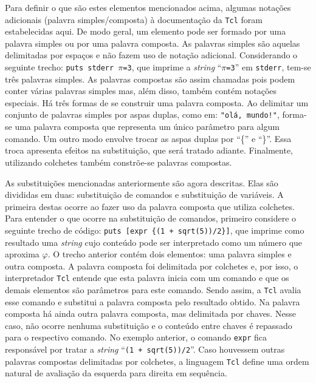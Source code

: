 Para definir o que são estes elementos mencionados acima, algumas
notações adicionais (palavra simples/composta) à documentação da \texttt{Tcl}
\cite{Tcl.n-manpage} foram estabelecidas aqui. De modo geral, um
elemento pode ser formado por uma palavra simples ou por uma palavra
composta. As palavras simples são
aquelas delimitadas por espaços e não fazem uso de notação adicional.
Considerando o seguinte trecho:
\texttt{puts stderr $\pi$=3},
 que imprime a \textit{string} ``\texttt{$\pi$=3}''
em \verb!stderr!, tem-se três palavras simples. As palavras compostas
são assim chamadas pois podem conter várias palavras simples mas, além
disso, também contém notações especiais. Há três formas de se
construir uma palavra composta. Ao delimitar um conjunto de
palavras simples por aspas duplas, como em: \verb|"olá, mundo!"|,
forma-se uma palavra composta que representa um único parâmetro para
algum comando. Um outro modo envolve trocar as aspas duplas por ``\{''
e ``\}''. Essa troca apresenta efeitos na substituição, que será
tratado adiante. Finalmente, utilizando colchetes também constrõe-se
palavras compostas.

As substituições mencionadas anteriormente são agora descritas. Elas
são divididas em duas: substituição de comandos e substituição de
variáveis. A primeira destas ocorre ao fazer uso da palavra composta
que utiliza colchetes. Para entender o que ocorre na substituição de
comandos, primeiro considere o seguinte trecho de código:
\verb!puts [expr {(1 + sqrt(5))/2}]!, que imprime como resultado
uma \textit{string} cujo conteúdo pode ser interpretado como um número
que aproxima $\varphi$.
O trecho anterior contém dois
elementos: uma palavra simples e outra composta. A palavra composta foi
delimitada por colchetes e, por isso, o interpretador \texttt{Tcl}
entende que esta palavra inicia com um comando e que os demais
elementos são parâmetros para este comando. Sendo assim, a
\texttt{Tcl} avalia esse comando e substitui a palavra composta pelo
resultado obtido. Na palavra composta há ainda outra palavra composta,
mas delimitada por chaves. Nesse caso, não ocorre nenhuma substituição
e o conteúdo entre chaves é repassado para o respectivo comando. No
exemplo anterior, o comando \verb!expr! fica responsável por tratar a
\textit{string} ``\verb!(1 + sqrt(5))/2!''. Caso houvessem outras
palavras compostas delimitadas por colchetes, %
 a linguagem \texttt{Tcl}
define uma ordem natural de avaliação da esquerda para direita em
sequência.

